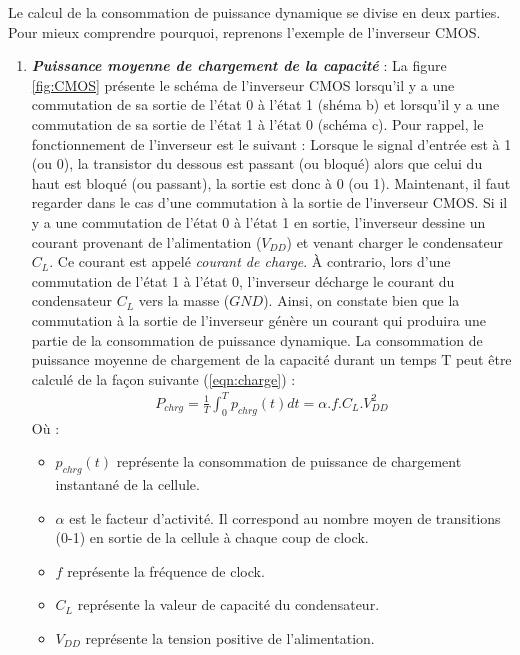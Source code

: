 \documentclass[10pt, oneside, a4paper]{article}
\begin{document}
\vspace{+0.5 cm}\hspace{-0.5 cm}

Le calcul de la consommation de puissance dynamique se divise en deux parties. Pour mieux comprendre pourquoi, reprenons l'exemple de l'inverseur CMOS.

\begin{enumerate}
\vspace{-0.2 cm}\item \textbf{\textit{Puissance moyenne de chargement de la capacité}} : La figure \ref{fig:CMOS} présente le schéma de l'inverseur CMOS lorsqu'il y a une commutation de sa sortie de l'état 0 à l'état 1 (shéma b) et lorsqu'il y a une commutation de sa sortie de l'état 1 à l'état 0 (schéma c). Pour rappel, le fonctionnement de l'inverseur est le suivant : Lorsque le signal d'entrée est à 1 (ou 0), la transistor du dessous est passant (ou bloqué) alors que celui du haut est bloqué (ou passant), la sortie est donc à 0 (ou 1). Maintenant, il faut regarder dans le cas d'une commutation à la sortie de l'inverseur CMOS. Si il y a une commutation de l'état 0 à l'état 1 en sortie, l'inverseur dessine un courant provenant de l'alimentation ($V_{DD}$) et venant charger le condensateur $C_L$. Ce courant est appelé \textit{courant de charge}. À contrario, lors d'une commutation de l'état 1 à l'état 0, l'inverseur décharge le courant du condensateur $C_L$ vers la masse ($GND$). Ainsi, on constate bien que la commutation à la sortie de l'inverseur génère un courant qui produira une partie de la consommation de puissance dynamique. La consommation de puissance moyenne de chargement de la capacité durant un temps T peut être calculé de la façon suivante (\ref{eqn:charge}) :
\begin{gather}
	P_{chrg} = \frac{1}{T}\int_{0}^{T}p_{chrg}(t)dt=\alpha.f.C_{L}.V_{DD}^{2}\label{eqn:charge}
\end{gather}
Où : 
\begin{itemize}
\item $p_{chrg}(t)$ représente la consommation de puissance de chargement instantané de la cellule.
\item $\alpha$ est le facteur d'activité. Il correspond au nombre moyen de transitions (0-1) en sortie de la cellule à chaque coup de clock.
\item $f$ représente la fréquence de clock.
\item $C_L$ représente la valeur de capacité du condensateur.
\item $V_{DD}$ représente la tension positive de l'alimentation. \\
\end{itemize}



\end{enumerate}
\end{document}
